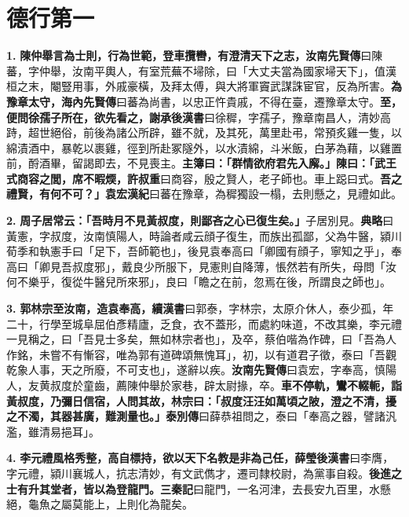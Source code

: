\chapter{德行第一}

\textbf{1.} \textbf{陳仲舉言為士則，行為世範，登車攬轡，有澄清天下之志，}{\footnotesize \textbf{汝南先賢傳}曰陳蕃，字仲舉，汝南平輿人，有室荒蕪不埽除，曰「大丈夫當為國家埽天下」，值漢桓之末，閹豎用事，外戚豪橫，及拜太傅，與大將軍竇武謀誅宦官，反為所害。}\textbf{為豫章太守，}{\footnotesize \textbf{海內先賢傳}曰蕃為尚書，以忠正忤貴戚，不得在臺，遷豫章太守。}\textbf{至，便問徐孺子所在，欲先看之，}{\footnotesize \textbf{謝承後漢書}曰徐穉，字孺子，豫章南昌人，清妙高跱，超世絕俗，前後為諸公所辟，雖不就，及其死，萬里赴弔，常預炙雞一隻，以綿漬酒中，暴乾以裹雞，徑到所赴冢隧外，以水漬綿，斗米飯，白茅為藉，以雞置前，酹酒畢，留謁即去，不見喪主。}\textbf{主簿曰：「群情欲府君先入廨。」陳曰：「武王式商容之閭，席不暇煗，}{\footnotesize \textbf{許叔重}曰商容，殷之賢人，老子師也。車上跽曰式。}\textbf{吾之禮賢，有何不可？」}{\footnotesize \textbf{袁宏漢紀}曰蕃在豫章，為穉獨設一榻，去則懸之，見禮如此。}

\textbf{2.} \textbf{周子居常云：「吾時月不見黃叔度，則鄙吝之心已復生矣。」}{\footnotesize 子居別見。\textbf{典略}曰黃憲，字叔度，汝南慎陽人，時論者咸云顔子復生，而族出孤鄙，父為牛醫，潁川荀季和執憲手曰「足下，吾師範也」，後見袁奉高曰「卿國有顔子，寧知之乎」，奉高曰「卿見吾叔度邪」，戴良少所服下，見憲則自降薄，悵然若有所失，母問「汝何不樂乎，復從牛醫兒所來邪」，良曰「瞻之在前，忽焉在後，所謂良之師也」。}

\textbf{3.} \textbf{郭林宗至汝南，造袁奉高，}{\footnotesize \textbf{續漢書}曰郭泰，字林宗，太原介休人，泰少孤，年二十，行學至城阜屈伯彥精廬，乏食，衣不蓋形，而處約味道，不改其樂，李元禮一見稱之，曰「吾見士多矣，無如林宗者也」，及卒，蔡伯喈為作碑，曰「吾為人作銘，未嘗不有慚容，唯為郭有道碑頌無愧耳」，初，以有道君子徵，泰曰「吾觀乾象人事，天之所廢，不可支也」，遂辭以疾。\textbf{汝南先賢傳}曰袁宏，字奉高，慎陽人，友黄叔度於童齒，薦陳仲舉於家巷，辟太尉掾，卒。}\textbf{車不停軌，鸞不輟軛，詣黃叔度，乃彌日信宿，人問其故，林宗曰：「叔度汪汪如萬頃之陂，澄之不清，擾之不濁，其器甚廣，難測量也。」}{\footnotesize \textbf{泰別傳}曰薛恭祖問之，泰曰「奉高之器，譬諸汎濫，雖清易挹耳」。}

\textbf{4.} \textbf{李元禮風格秀整，高自標持，欲以天下名教是非為己任，}{\footnotesize \textbf{薛瑩後漢書}曰李膺，字元禮，潁川襄城人，抗志清妙，有文武儁才，遷司隸校尉，為黨事自殺。}\textbf{後進之士有升其堂者，皆以為登龍門。}{\footnotesize \textbf{三秦記}曰龍門，一名河津，去長安九百里，水懸絕，龜魚之屬莫能上，上則化為龍矣。}

